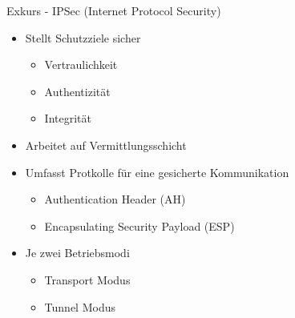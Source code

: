 \documentclass{beamer}
\begin{document}


\begin{frame}{Exkurs - IPSec (Internet Protocol Security)}{\secname}
  \begin{itemize}
    \item Stellt Schutzziele sicher
    \begin{itemize}
      \item Vertraulichkeit
      \item Authentizität
      \item Integrität
    \end{itemize}
    \item Arbeitet auf Vermittlungsschicht
    \item Umfasst Protkolle für eine gesicherte Kommunikation
    \begin{itemize}
      \item Authentication Header (AH)
      \item Encapsulating Security Payload (ESP)
    \end{itemize}
    \item Je zwei Betriebsmodi
    \begin{itemize}
      \item Transport Modus
      \item Tunnel Modus
    \end{itemize}
  \end{itemize}
\end{frame}
\end{document}
